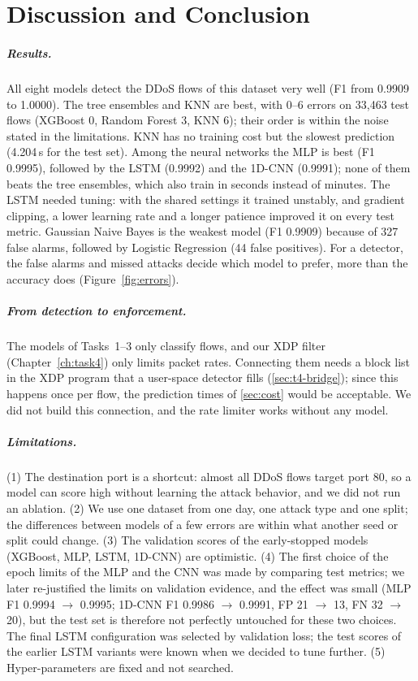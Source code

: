 \chapter{Discussion and Conclusion}\label{chap:discussion}

\paragraph{Results.} All eight models detect the DDoS flows of this dataset very well (F1 from 0.9909 to 1.0000). The tree ensembles and KNN are best, with 0--6 errors on 33,463 test flows (XGBoost 0, Random Forest 3, KNN 6); their order is within the noise stated in the limitations. KNN has no training cost but the slowest prediction (4.204\,s for the test set). Among the neural networks the MLP is best (F1 0.9995), followed by the LSTM (0.9992) and the 1D-CNN (0.9991); none of them beats the tree ensembles, which also train in seconds instead of minutes. The LSTM needed tuning: with the shared settings it trained unstably, and gradient clipping, a lower learning rate and a longer patience improved it on every test metric. Gaussian Naive Bayes is the weakest model (F1 0.9909) because of 327 false alarms, followed by Logistic Regression (44 false positives). For a detector, the false alarms and missed attacks decide which model to prefer, more than the accuracy does (Figure~\ref{fig:errors}).

\paragraph{From detection to enforcement.} The models of Tasks~1--3 only classify flows, and our XDP filter (Chapter~\ref{ch:task4}) only limits packet rates. Connecting them needs a block list in the XDP program that a user-space detector fills (\cref{sec:t4-bridge}); since this happens once per flow, the prediction times of \cref{sec:cost} would be acceptable. We did not build this connection, and the rate limiter works without any model.

\paragraph{Limitations.} (1) The destination port is a shortcut: almost all DDoS flows target port 80, so a model can score high without learning the attack behavior, and we did not run an ablation. (2) We use one dataset from one day, one attack type and one split; the differences between models of a few errors are within what another seed or split could change. (3) The validation scores of the early-stopped models (XGBoost, MLP, LSTM, 1D-CNN) are optimistic. (4) The first choice of the epoch limits of the MLP and the CNN was made by comparing test metrics; we later re-justified the limits on validation evidence, and the effect was small (MLP F1 0.9994 $\to$ 0.9995; 1D-CNN F1 0.9986 $\to$ 0.9991, FP 21 $\to$ 13, FN 32 $\to$ 20), but the test set is therefore not perfectly untouched for these two choices. The final LSTM configuration was selected by validation loss; the test scores of the earlier LSTM variants were known when we decided to tune further. (5) Hyper-parameters are fixed and not searched.

